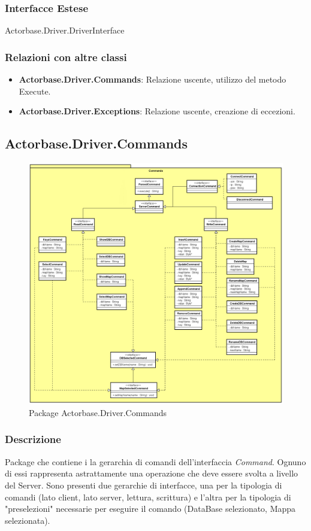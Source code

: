 \documentclass[a4paper]{article}
\begin{document}
		\subsubsection{Interfacce Estese}
			Actorbase.Driver.DriverInterface
		\subsubsection{Relazioni con altre classi}
		\begin{itemize}
			\item \textbf{Actorbase.Driver.Commands}: Relazione uscente, utilizzo del metodo Execute.
			\item \textbf{Actorbase.Driver.Exceptions}: Relazione uscente, creazione di eccezioni.
		\end{itemize}
		
		
	\subsection{Actorbase.Driver.Commands}
		\begin{figure} [H]
			\centering
			\includegraphics[scale=0.40]{ST/Client/CommandsClasses.png}
			\caption{Package Actorbase.Driver.Commands}
		\end{figure}
		\subsubsection{Descrizione}
			Package che contiene i la gerarchia di comandi dell'interfaccia \emph{Command}. Ognuno di essi rappresenta astrattamente una operazione che deve essere svolta a livello del Server. Sono presenti due gerarchie di interfacce, una per la tipologia di comandi (lato client, lato server, lettura, scrittura) e l'altra per la tipologia di "preselezioni" necessarie per eseguire il comando (DataBase selezionato, Mappa selezionata).
		
\end{document}
